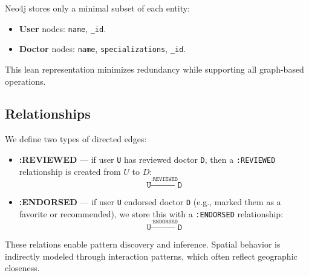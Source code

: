 Neo4j stores only a minimal subset of each entity:
\begin{itemize}
  \item \textbf{User} nodes: \texttt{name}, \texttt{\_id}.
  \item \textbf{Doctor} nodes: \texttt{name}, \texttt{specializations}, \texttt{\_id}.
\end{itemize}

This lean representation minimizes redundancy while supporting all graph-based operations.

\subsection{Relationships}

We define two types of directed edges:
\begin{itemize}
  \item \textbf{:REVIEWED} — if user \texttt{U} has reviewed doctor \texttt{D}, then a \texttt{:REVIEWED} relationship is created from $U$ to $D$:  
  \[
    \texttt{U} \xrightarrow{\texttt{:REVIEWED}} \texttt{D}
  \]

  \item \textbf{:ENDORSED} — if user \texttt{U} endorsed doctor \texttt{D} (e.g., marked them as a favorite or recommended), we store this with a \texttt{:ENDORSED} relationship:  
  \[
    \texttt{U} \xrightarrow{\texttt{:ENDORSED}} \texttt{D}
  \]
\end{itemize}

These relations enable pattern discovery and inference. Spatial behavior is indirectly modeled through interaction patterns, which often reflect geographic closeness.

